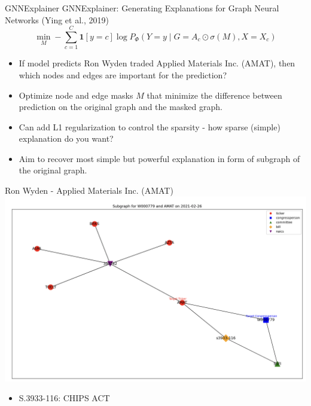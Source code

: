 \documentclass{beamer}
\begin{document}
	\begin{frame}{GNNExplainer}
		GNNExplainer: Generating Explanations for Graph Neural Networks (Ying et al., 2019)
		$$
		\min _M-\sum_{c=1}^C \mathbf{1}[y=c] \log P_{\Phi}\left(Y=y \mid G=A_c \odot \sigma(M), X=X_c\right)
		$$
		\begin{itemize}
	\item If model predicts Ron Wyden traded Applied Materials Inc. (AMAT), then which nodes and edges are important for the prediction?
	\item Optimize node and edge masks $M$ that minimize the difference between prediction on the original graph and the masked graph.
	\item Can add L1 regularization to control the sparsity - how sparse (simple) explanation do you want?
	\item Aim to recover most simple but powerful explanation in form of subgraph of the original graph.
		\end{itemize}
	\end{frame}

	\begin{frame}{Ron Wyden - Applied Materials Inc. (AMAT)} 		
		\centering	\includegraphics[scale=0.24]{./images/gnnex-w.png}
		\begin{itemize}
			\item S.3933-116: CHIPS ACT 
	\end{itemize}
	\end{frame}
	
\end{document}

